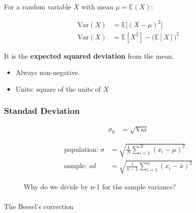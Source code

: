 \documentclass[
  a4paper,
]{scrbook}
\makeatletter
\let\oldparagraph\paragraph
\renewcommand{\paragraph}{
    \@ifstar
      \xxxParagraphStar
      \xxxParagraphNoStar
  }
\newcommand{\xxxParagraphStar}[1]{\oldparagraph*{#1}\mbox{}}
\newcommand{\xxxParagraphNoStar}[1]{\oldparagraph{#1}\mbox{}}
\makeatother
\begin{document}
For a random variable \(X\) with mean \(\mu=\mathbb{E}\!(X)\):

\begin{align}
\mathrm{Var}(X) &= \mathbb{E}\!\big[(X - \mu)^2\big] \label{var} \\
\mathrm{Var}(X) &= \mathbb{E}[X^2] - \big(\mathbb{E}[X]\big)^2
\end{align}

It is the \textbf{expected squared deviation} from the mean.

\begin{itemize}
\item
  Always non-negative.
\item
  Units: square of the units of \(X\)
\end{itemize}

\subsubsection{Standad Deviation}\label{standad-deviation}

\begin{align}
\sigma_0 &= \sqrt{\mathrm{Var}}
\end{align}

\begin{align}
\text{population: } \sigma &= \sqrt{\frac{1}{N} \sum_{i=1}^{N} (x_i - \mu)^2}\\
\text{sample: } sd &= \sqrt{\frac{1}{n-1} \sum_{i=1}^{n} (x_i - \bar{x})^2}
\end{align}

\begin{figure}[ht]


\caption{\label{fig-bessel-intro}Why do we divide by n-1 for the sample
variance?}

\end{figure}%

\paragraph{The Bessel's correction}\label{the-bessels-correction}
\end{document}
